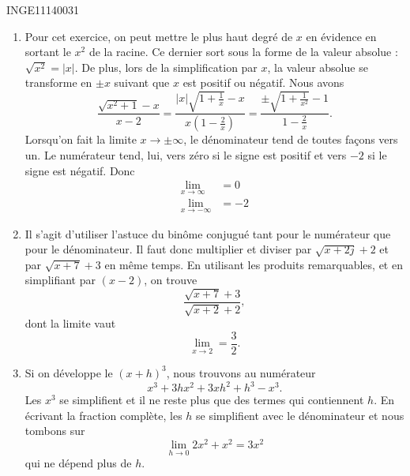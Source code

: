 \begin{corrige}{INGE11140031}
\begin{enumerate}
		\item
			Pour cet exercice, on peut mettre le plus haut degré de $x$ en évidence en sortant le $x^2$ de la racine. Ce dernier sort sous la forme de la valeur absolue : $\sqrt{x^2}=| x |$. De plus, lors de la simplification par $x$, la valeur absolue se transforme en $\pm x$ suivant que $x$ est positif ou négatif. Nous avons
			\begin{equation}
				\frac{ \sqrt{x^2+1}-x }{ x-2 }=\frac{ | x |\sqrt{1+\frac{1}{ x }}-x }{ x(1-\frac{ 2 }{ x }) }=\frac{ \pm\sqrt{1+\frac{1}{ x^2 }}-1 }{ 1-\frac{ 2 }{ x } }.
			\end{equation}
			Lorsqu'on fait la limite $x\to \pm\infty$, le dénominateur tend de toutes façons vers un. Le numérateur tend, lui, vers zéro si le signe est positif et vers $-2$ si le signe est négatif. Donc
			\begin{subequations}
				\begin{align}
					\lim_{x\to \infty} &=0\\
					\lim_{x\to -\infty} &=-2
				\end{align}
			\end{subequations}

		\item
			Il s'agit d'utiliser l'astuce du binôme conjugué tant pour le numérateur que pour le dénominateur. Il faut donc multiplier et diviser par $\sqrt{x+2j}+2$ et par $\sqrt{x+7}+3$ en même temps. En utilisant les produits remarquables, et en simplifiant par $(x-2)$, on trouve
			\begin{equation}
				\frac{ \sqrt{x+7}+3 }{ \sqrt{x+2}+2 },
			\end{equation}
			dont la limite vaut 
			\begin{equation}
				\lim_{x\to 2} =\frac{ 3 }{ 2 }.
			\end{equation}

		\item
			Si on développe le $(x+h)^3$, nous trouvons au numérateur
			\begin{equation}
				x^3+3hx^2+3xh^2+h^3-x^3.
			\end{equation}
			Les $x^3$ se simplifient et il ne reste plus que des termes qui contiennent $h$. En écrivant la fraction complète, les $h$ se simplifient avec le dénominateur et nous tombons sur
			\begin{equation}
				\lim_{h\to 0} 2x^2+x^2=3x^2
			\end{equation}
			qui ne dépend plus de $h$.
			
	\end{enumerate}

\end{corrige}
